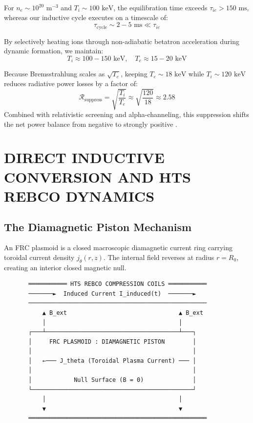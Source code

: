 \documentclass[10pt,twocolumn]{article}
\begin{document}
For $n_e \sim 10^{20}\text{ m}^{-3}$ and $T_i \sim 100\text{ keV}$, the equilibration time exceeds $\tau_{ie} > 150\text{ ms}$, whereas our inductive cycle executes on a timescale of:
\begin{equation}
  \tau_{\text{cycle}} \sim 2 - 5\text{ ms} \ll \tau_{ie}
\end{equation}

By selectively heating ions through non-adiabatic betatron acceleration during dynamic formation, we maintain:
\begin{equation}
  T_i \approx 100 - 150\text{ keV}, \quad T_e \approx 15 - 20\text{ keV}
\end{equation}

Because Bremsstrahlung scales as $\sqrt{T_e}$, keeping $T_e \sim 18\text{ keV}$ while $T_i \sim 120\text{ keV}$ reduces radiative power losses by a factor of:
\begin{equation}
  \mathcal{R}_{\text{suppress}} = \sqrt{\frac{T_i}{T_e}} \approx \sqrt{\frac{120}{18}} \approx 2.58
\end{equation}
Combined with relativistic screening and alpha-channeling, this suppression shifts the net power balance from negative to strongly positive \cite{Fisch1992}.



\section{DIRECT INDUCTIVE CONVERSION AND HTS REBCO DYNAMICS}


\subsection{The Diamagnetic Piston Mechanism}

An FRC plasmoid is a closed macroscopic diamagnetic current ring carrying toroidal current density $j_\theta(r, z)$. The internal field reverses at radius $r = R_0$, creating an interior closed magnetic null.

\begin{verbatim}
       ═══════════ HTS REBCO COMPRESSION COILS ═══════════
       ───────►  Induced Current I_induced(t)  ───────►
       ───────────────────────────────────────────────────
           ▲ B_ext                                ▲ B_ext
           │                                      │
       ┌───┴──────────────────────────────────────┴───┐
       │     FRC PLASMOID : DIAMAGNETIC PISTON        │
       │                                              │
       │   ←─── J_theta (Toroidal Plasma Current) ─── │
       │                                              │
       │            Null Surface (B = 0)              │
       └──────────────────────────────────────────────┘
           │                                      │
           ▼                                      ▼
       ═══════════════════════════════════════════════════
\end{verbatim}
\end{document}

